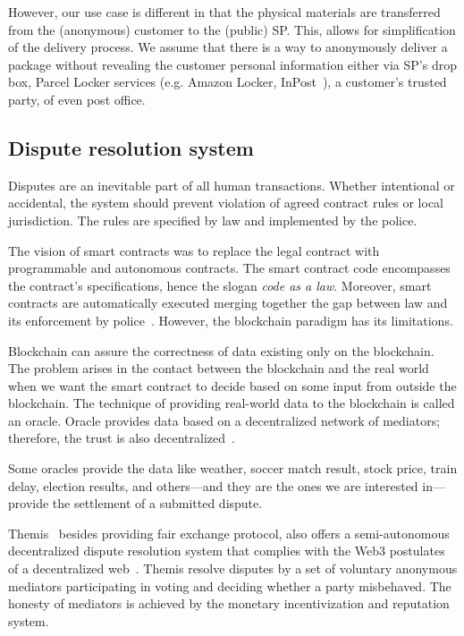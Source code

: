 \documentclass[pdftex,twocolumn,epjc3]{svjour3}
\begin{document}
{However, our use case is different in that the physical materials are transferred from the (anonymous) customer to the (public) SP. This, allows for simplification of the delivery process. We assume that there is a way to anonymously deliver a package without revealing the customer personal information either via SP's drop box, Parcel Locker services (e.g. Amazon Locker, InPost~\cite{inpostParcelLockerService}), a customer's trusted party, of even post office.

\subsection{Dispute resolution system}
\label{sec:dispute-resolution}

Disputes are an inevitable part of all human transactions. Whether intentional or accidental, the system should prevent violation of agreed contract rules or local jurisdiction. The rules are specified by law and implemented by the police.

The vision of smart contracts was to replace the legal contract with
programmable and autonomous contracts. The smart contract code encompasses the contract's specifications, hence the slogan \textit{code as a law}. Moreover, smart contracts are automatically executed merging together the gap between law and its enforcement by police~\cite{allenGovernanceBlockchainDispute2019}. However, the blockchain paradigm has its limitations. 
 
Blockchain can assure the correctness of data existing only on the blockchain. The problem arises in the contact between the blockchain and the real world when we want the smart contract to decide based on some input from outside the blockchain. The technique of providing real-world data to the blockchain is called an oracle. Oracle provides data based on a decentralized network of mediators; therefore, the trust is also decentralized~\cite{breidenbachChainlinkNextSteps2021}.

Some oracles provide the data like weather, soccer match result, stock
price, train delay, election results, and others—and they are the ones we
are interested in—provide the settlement of a submitted dispute.

Themis~\cite{mengThemisDecentralizedEscrow2019} besides providing fair exchange protocol,
also offers a semi-autonomous decentralized dispute resolution system that complies with the Web3 postulates of a decentralized web~\cite{ethereumWhatWeb3Why2023}. Themis resolve disputes by a set of voluntary anonymous mediators participating in voting and deciding whether a party misbehaved. The honesty of mediators is achieved by the monetary incentivization and reputation system.

}
\end{document}
